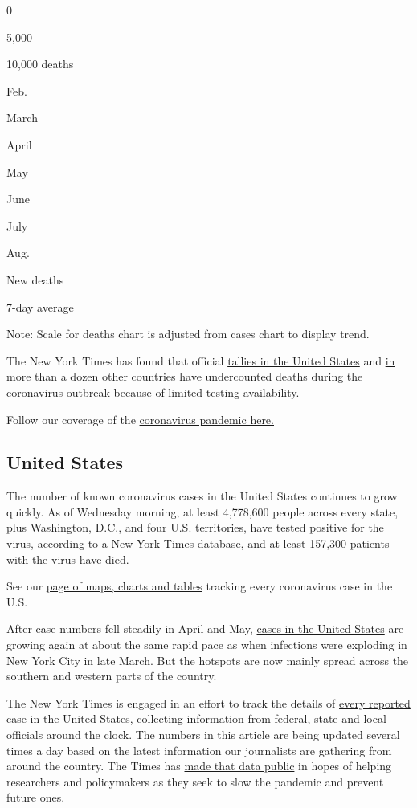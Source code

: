 0

5,000

10,000 deaths

Feb.

March

April

May

June

July

Aug.

New deaths

7-day average

Note: Scale for deaths chart is adjusted from cases chart to display
trend.

The New York Times has found that official
\href{https://www.nytimes.com/interactive/2020/04/28/us/coronavirus-death-toll-total.html}{tallies
in the United States} and
\href{https://www.nytimes.com/interactive/2020/04/21/world/coronavirus-missing-deaths.html}{in
more than a dozen other countries} have undercounted deaths during the
coronavirus outbreak because of limited testing availability.

Follow our coverage of the
\href{https://www.nytimes.com/2020/08/04/world/coronavirus-covid-19.html}{coronavirus
pandemic here.}

\hypertarget{united-states}{%
\subsection{United States}\label{united-states}}

The number of known coronavirus cases in the United States continues to
grow quickly. As of Wednesday morning, at least 4,778,600 people across
every state, plus Washington, D.C., and four U.S. territories, have
tested positive for the virus, according to a New York Times database,
and at least 157,300 patients with the virus have died.

See our
\href{https://www.nytimes.com/interactive/2020/us/coronavirus-us-cases.html}{page
of maps, charts and tables} tracking every coronavirus case in the U.S.

After case numbers fell steadily in April and May,
\href{https://www.nytimes.com/interactive/2020/us/coronavirus-us-cases.html}{cases
in the United States} are growing again at about the same rapid pace as
when infections were exploding in New York City in late March. But the
hotspots are now mainly spread across the southern and western parts of
the country.

The New York Times is engaged in an effort to track the details of
\href{https://www.nytimes.com/interactive/2020/us/coronavirus-us-cases.html}{every
reported case in the United States}, collecting information from
federal, state and local officials around the clock. The numbers in this
article are being updated several times a day based on the latest
information our journalists are gathering from around the country. The
Times has
\href{https://www.nytimes.com/article/coronavirus-county-data-us.html?action=click\&module=Spotlight\&pgtype=Homepage}{made
that data public} in hopes of helping researchers and policymakers as
they seek to slow the pandemic and prevent future ones.

